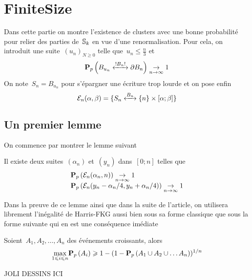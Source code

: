 \section{FiniteSize}
Dans cette partie on montre l'existence de clusters avec une bonne probabilité pour relier des parties de~$\mathbb{S}_k$ en vue d'une renormalisation. Pour cela, on introduit une suite~$(u_n)_{N \geqslant0}$ telle que~$u_n \leqslant \frac{n}{3}$ et %
	\[
		\Pp{\relie*[B_n]{B_{u_n}}{\partial B_n}} \underset{n \to \infty}{\to} 1 %
	\] 
	On note~$S_n = B_{u_n}$ pour s'épargner une écriture trop lourde et on pose enfin
	\[
		\mathcal{E}_n( \alpha, \beta ) = \{\relie[B_n]{S_n}{\{n\} \times [ \alpha ; \beta ]} \} %
	\]
	\subsection{Un premier lemme}
		On commence par montrer le lemme suivant
		\begin{lem}\label{lem:collagesElem} %
			Il existe deux suites~$(\alpha_n)$ et~$(y_n)$ dans~$[0; n]$ telles que %
			\[
				\begin{array}{l} %
					\Pp{\mathcal{E}_n(\alpha_n, n)} \underset{n \to \infty}{\to} 1 \\ %
					\Pp{\mathcal{E}_n(y_n - \alpha_n/4, y_n + \alpha_n/4)} \underset{n \to \infty}{\to} 1 %
				\end{array}
			\]
		\end{lem}
		Dans la preuve de ce lemme ainsi que dans la suite de l'article, on utilisera librement l'inégalité de Harris-FKG aussi bien sous sa forme classique que sous la forme suivante qui en est une conséquence imédiate %
		\begin{lem}\label{lem:HarrisFKG} %
			Soient~$A_1, A_2, \ldots, A_n$ des événements croissants, alors %
			\[
				\underset{1 \leq i \leq n}{\max} \Pp{A_i} \geq 1 - (1 - \Pp{A_1 \cup A_2 \cup \ldots A_n})^{1/n} %
			\]
		\end{lem}
		
		JOLI DESSINS ICI %

